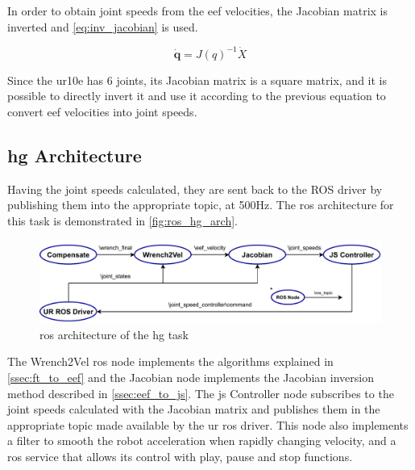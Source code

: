 \par In order to obtain joint speeds from the \ac{eef} velocities, the Jacobian matrix is inverted and \autoref{eq:inv_jacobian} is used.

\begin{equation}
    \dot{\mathbf{q}} = J(q)^{-1} \dot{X}
    \label{eq:inv_jacobian}
\end{equation}

\noindent Since the \ac{ur10e} has 6 joints, its Jacobian matrix is a square matrix, and it is possible to directly invert it and use it according to the previous equation to convert \ac{eef} velocities into joint speeds.



\subsection{\ac{hg} Architecture}

\par Having the joint speeds calculated, they are sent back to the ROS driver by publishing them into the appropriate topic, at 500Hz. The \ac{ros} architecture for this task is demonstrated in \autoref{fig:ros_hg_arch}.

\begin{figure}[h]
    \centering
    \includegraphics[width=\linewidth]{figs/chp5/ros_hg_arch.pdf}
    \caption{\ac{ros} architecture of the \ac{hg} task}
    \label{fig:ros_hg_arch}
\end{figure}

\par The Wrench2Vel \ac{ros} node implements the algorithms explained in \autoref{ssec:ft_to_eef} and the Jacobian node implements the Jacobian inversion method described in \autoref{ssec:eef_to_js}. The \ac{js} Controller node subscribes to the joint speeds calculated with the Jacobian matrix and publishes them in the appropriate topic made available by the \ac{ur} \ac{ros} driver. This node also implements a filter to smooth the robot acceleration when rapidly changing velocity, and a \ac{ros} service that allows its control with play, pause and stop functions.

